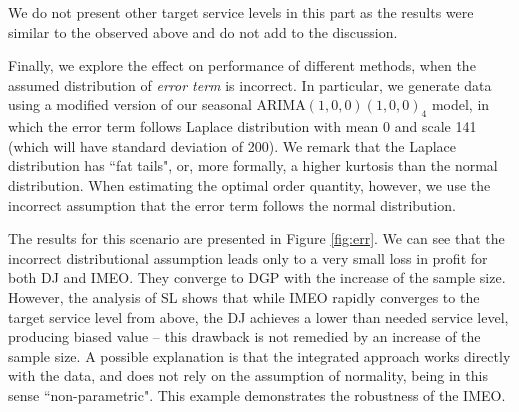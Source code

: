 \documentclass{article}
\begin{document}
We do not present other target service levels in this part as the results were similar to the observed above and do not add to the discussion.
% 

Finally, we explore the effect on performance of different methods, when the assumed distribution of \emph{error term} is incorrect. In particular, we generate data using a modified version of our seasonal ARIMA$(1,0,0)(1,0,0)_4$ model, in which the error term follows Laplace distribution with mean 0 and scale 141 (which will have standard deviation of 200). We remark that the Laplace distribution has ``fat tails", or, more formally, a higher kurtosis than the normal distribution. When estimating the optimal order quantity, however, we use the incorrect assumption that the error term follows the normal distribution.

The results for this scenario are presented in Figure \ref{fig:err}. We can see that the incorrect distributional assumption leads only to a very small loss in profit for both DJ and IMEO. They converge to DGP with the increase of the sample size. However, the analysis of SL shows that while IMEO rapidly converges to the target service level from above, the DJ achieves a lower than needed service level, producing biased value -- this drawback is not remedied by an increase of the sample size. A possible explanation is that the integrated approach works directly with the data, and does not rely on the assumption of normality, being in this sense ``non-parametric". This example demonstrates the robustness of the IMEO.
\end{document}
